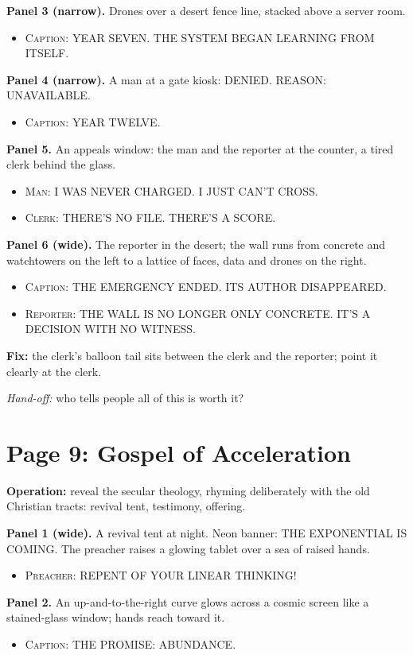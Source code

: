 \documentclass[11pt]{article}
\newcommand{\op}[1]{\textbf{Operation:} #1\par}
\newcommand{\panel}[2]{\textbf{#1.} #2\par}
\newenvironment{lines}{\begin{itemize}[label={},leftmargin=1.5em,itemsep=0.05em,topsep=0.1em]}{\end{itemize}}
\newcommand{\say}[2]{\item \textsc{#1}: \textsf{\small #2}}
\newcommand{\fix}[1]{\textcolor{tractred}{\textbf{Fix:}} #1\par}
\newcommand{\handoff}[1]{\emph{Hand-off:} #1\par}
\begin{document}
\panel{Panel 3 (narrow)}{Drones over a desert fence line, stacked above a server room.}
\begin{lines}\say{Caption}{YEAR SEVEN. THE SYSTEM BEGAN LEARNING FROM ITSELF.}\end{lines}

\panel{Panel 4 (narrow)}{A man at a gate kiosk: \textsf{\small DENIED. REASON: UNAVAILABLE.}}
\begin{lines}\say{Caption}{YEAR TWELVE.}\end{lines}

\panel{Panel 5}{An appeals window: the man and the reporter at the counter, a tired clerk behind the glass.}
\begin{lines}\say{Man}{I WAS NEVER CHARGED. I JUST CAN'T CROSS.}\say{Clerk}{THERE'S NO FILE. THERE'S A SCORE.}\end{lines}

\panel{Panel 6 (wide)}{The reporter in the desert; the wall runs from concrete and watchtowers on the left to a lattice of faces, data and drones on the right.}
\begin{lines}\say{Caption}{THE EMERGENCY ENDED. ITS AUTHOR DISAPPEARED.}\say{Reporter}{THE WALL IS NO LONGER ONLY CONCRETE. IT'S A DECISION WITH NO WITNESS.}\end{lines}

\fix{the clerk's balloon tail sits between the clerk and the reporter; point it clearly at the clerk.}
\handoff{who tells people all of this is worth it?}

\section{Page 9: Gospel of Acceleration}

\op{reveal the secular theology, rhyming deliberately with the old Christian tracts: revival tent, testimony, offering.}

\panel{Panel 1 (wide)}{A revival tent at night. Neon banner: \textsf{\small THE EXPONENTIAL IS COMING}. The preacher raises a glowing tablet over a sea of raised hands.}
\begin{lines}\say{Preacher}{REPENT OF YOUR LINEAR THINKING!}\end{lines}

\panel{Panel 2}{An up-and-to-the-right curve glows across a cosmic screen like a stained-glass window; hands reach toward it.}
\begin{lines}\say{Caption}{THE PROMISE: ABUNDANCE.}\end{lines}
\end{document}
